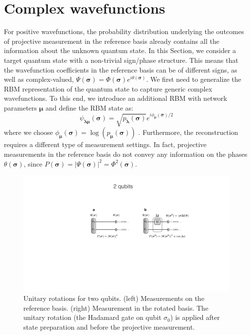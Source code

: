 \documentclass[submission, Phys, hidelinks]{SciPost}
\begin{document}
\section{Complex wavefunctions}
\label{sec:complex}
For positive wavefunctions, the probability distribution underlying the outcomes of projective measurement in the reference basis already contains all the information about the unknown quantum state. In this Section, we consider a target quantum state with a non-trivial sign/phase structure. This means that the wavefunction coefficients in the reference basis can be of different signs, as well as complex-valued, $\Psi(\bm{\sigma})=\Phi(\bm{\sigma})e^{i\theta(\bm{\sigma})}$. We first need to generalize the RBM representation of the quantum state to capture generic complex wavefunctions. To this end, we introduce an additional RBM with network parameters $\bm{\mu}$ and define the RBM state as:
\begin{equation}
    \psi_{\bm{\lambda} \bm{\mu}} (\bm{\sigma})= \sqrt{p_{\bm{\lambda}} (\bm{\sigma})} e^{i \phi_{\bm{\mu}} (\bm{\sigma})/2}
\end{equation}
where we choose $\phi_{\bm{\mu}}(\bm{\sigma}) = \log (p_{\bm{\mu}} (\bm{\sigma}))$ \cite{torlai2018tomography}. Furthermore, the reconstruction requires a different type of measurement settings. In fact, projective measurements in the reference basis do not convey any information on the phases $\theta(\bm{\sigma})$, since $P(\bm{\sigma})=|\Psi(\bm{\sigma})|^2=\Phi^2(\bm{\sigma})$.

\begin{figure}[htb]
    \centering
    \includegraphics[width=\columnwidth, trim={0 0 0 40}, clip]{plots/2qubits_rotation}
    \caption{Unitary rotations for two qubits. (left) Measurements on the reference basis. (right) Measurement in the rotated basis. The unitary rotation (the Hadamard gate on qubit $\sigma_0$) is applied after state preparation and before the projective measurement.}
    \label{phase_learn} 
\end{figure}
\end{document}
